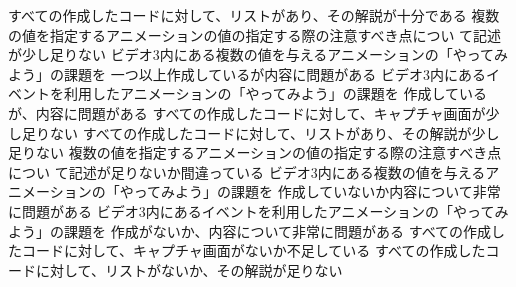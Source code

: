 \documentclass[a4j]{jreport}
\begin{document}
{{	{すべての作成したコードに対して、リストがあり、その解説が十分である}
  }
	{
	{複数の値を指定するアニメーションの値の指定する際の注意すべき点につい
	て記述が少し足りない}
	{ビデオ3内にある複数の値を与えるアニメーションの「やってみよう」の課題を
一つ以上作成しているが内容に問題がある}
	{ビデオ3内にあるイベントを利用したアニメーションの「やってみよう」の課題を
作成しているが、内容に問題がある}
	{すべての作成したコードに対して、キャプチャ画面が少し足りない}
	{すべての作成したコードに対して、リストがあり、その解説が少し足りない}
  }
	{
	{複数の値を指定するアニメーションの値の指定する際の注意すべき点につい
	て記述が足りないか間違っている}
	{ビデオ3内にある複数の値を与えるアニメーションの「やってみよう」の課題を
作成していないか内容について非常に問題がある}
	{ビデオ3内にあるイベントを利用したアニメーションの「やってみよう」の課題を
作成がないか、内容について非常に問題がある}
	{すべての作成したコードに対して、キャプチャ画面がないか不足している}
	{すべての作成したコードに対して、リストがないか、その解説が足りない}
	}
 	}
\end{document}
